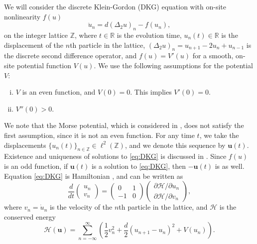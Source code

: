 \documentclass[12pt,reqno]{amsart}
\def\R{{\mathbb R}}
\def\Z{{\mathbb Z}}
\def\calH{\mathcal{H}}
\newcommand{\uvec}{\mathbf{u}}
\theoremstyle{definition}
\begin{document}
We will consider the discrete Klein-Gordon (DKG) equation with on-site nonlinearity $f(u)$
\begin{equation}\label{eq:DKG}
\ddot{u}_n = d (\Delta_2 u)_n - f(u_n),
\end{equation}
on the integer lattice $\Z$, where $t \in \R$ is the evolution time, $u_n(t) \in \R$ is the displacement of the $n$th particle in the lattice, $(\Delta_2 u)_n = u_{n+1} - 2 u_n + u_{n-1}$ is the discrete second difference operator, and $f(u) = V'(u)$ for a smooth, on-site potential function $V(u)$. We use the following assumptions for the potential $V$:
\begin{enumerate}[(i)\leftmargin=\parindent]
\item $V$ is an even function, and $V(0) = 0$. This implies $V'(0) = 0$.
\item $V''(0)>0$.
\end{enumerate}
We note that the Morse potential, which is considered in \cite{cuevas-maraver2016}, does not satisfy the first assumption, since it is not an even function. For any time $t$, we take the displacements $\{u_n(t)\}_{n \in \Z} \in \ell^2(\Z)$, and we denote this sequence by $\uvec(t)$. Existence and uniqueness of solutions to \cref{eq:DKG} is discussed in \cite{cuevas-maraver2016}. Since $f(u)$ is an odd function, if $\uvec(t)$ is a solution to \cref{eq:DKG}, then $-\uvec(t)$ is as well. Equation \cref{eq:DKG} is Hamiltonian \cites{KevrekidisWeinstein2000,cuevas-maraver2016}, and can be written as
\begin{equation}\label{eq:Hform}
\frac{d}{dt}\begin{pmatrix} u_n \\ v_n \end{pmatrix} = 
\begin{pmatrix} 0 & 1 \\ -1 & 0 \end{pmatrix}\begin{pmatrix} \partial \calH / \partial u_n \\ \partial \calH / \partial v_n \end{pmatrix},
\end{equation}
where $v_n = \dot{u}_n$ is the velocity of the $n$th particle in the lattice, and $\calH$ is the conserved energy
\begin{equation}\label{eq:H}
	\calH(\uvec) = \sum_{n=-\infty}^\infty 
	\left( \frac{1}{2} v_n^2 + \frac{d}{2} (u_{n+1} - u_n)^2 + V(u_n) \right).
\end{equation}
\end{document}
